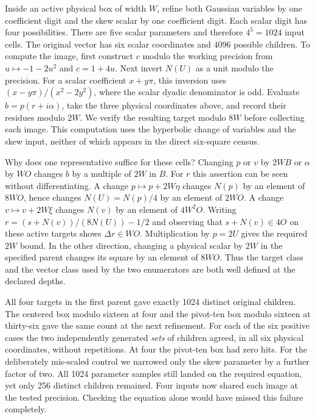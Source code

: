 \documentclass[12pt,letterpaper]{article}
\begin{document}
Inside an active physical box of width $W$, refine both Gaussian variables by one coefficient digit and the skew scalar by one coefficient digit. Each scalar digit has four possibilities. There are five scalar parameters and therefore $4^5=1024$ input cells. The original vector has six scalar coordinates and $4096$ possible children. To compute the image, first construct $c$ modulo the working precision from $u\mapsto-1-2u^2$ and $c=1+4u$. Next invert $N(U)$ as a unit modulo the precision. For a scalar coefficient $x+y\pi$, this inversion uses $(x-y\pi)/(x^2-2y^2)$, where the scalar dyadic denominator is odd. Evaluate $b=p(r+i\alpha)$, take the three physical coordinates above, and record their residues modulo $2W$. We verify the resulting target modulo $8W$ before collecting each image. This computation uses the hyperbolic change of variables and the skew input, neither of which appears in the direct six-square census.

Why does one representative suffice for these cells? Changing $p$ or $v$ by $2WB$ or $\alpha$ by $WO$ changes $b$ by a multiple of $2W$ in $B$. For $r$ this assertion can be seen without differentiating. A change $p\mapsto p+2W\eta$ changes $N(p)$ by an element of $8WO$, hence changes $N(U)=N(p)/4$ by an element of $2WO$. A change $v\mapsto v+2W\xi$ changes $N(v)$ by an element of $4W^2O$. Writing $r=(s+N(v))/(8N(U))-1/2$ and observing that $s+N(v)\in4O$ on these active targets shows $\Delta r\in WO$. Multiplication by $p=2U$ gives the required $2W$ bound. In the other direction, changing a physical scalar by $2W$ in the specified parent changes its square by an element of $8WO$. Thus the target class and the vector class used by the two enumerators are both well defined at the declared depths.

All four targets in the first parent gave exactly 1024 distinct original children. The centered box modulo sixteen at four and the pivot-ten box modulo sixteen at thirty-six gave the same count at the next refinement. For each of the six positive cases the two independently generated \emph{sets} of children agreed, in all six physical coordinates, without repetitions. At four the pivot-ten box had zero hits. For the deliberately mis-scaled control we narrowed only the skew parameter by a further factor of two. All 1024 parameter samples still landed on the required equation, yet only 256 distinct children remained. Four inputs now shared each image at the tested precision. Checking the equation alone would have missed this failure completely.
\end{document}
